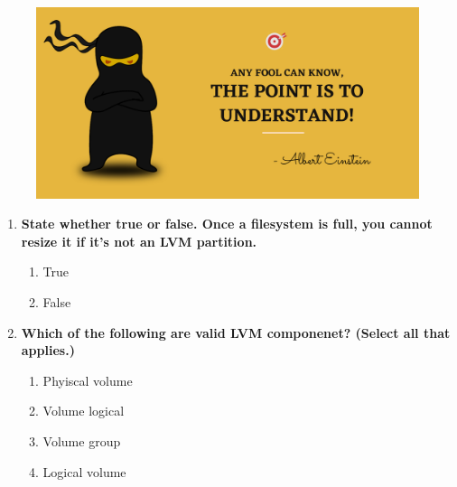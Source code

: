 \setlength{\columnsep}{3pt}
\begin{flushleft}
	
	\paragraph{}
	\bigskip
	
	\begin{figure}[h!]
		\centering
		\includegraphics[scale=.2]{content/practise.jpg}
	\end{figure}	
	\begin{enumerate}
		
		\item \textbf{State whether true or false. Once a filesystem is full, you cannot resize it if it's not an LVM partition.}
		\begin{enumerate}[label=(\alph*)]
			\item True %
			\item False
		\end{enumerate}
		\bigskip
		\bigskip
		
		
		\item \textbf{Which of the following are valid LVM componenet? (Select all that applies.)}
		\begin{enumerate}[label=(\alph*)]
			\item Phyiscal volume  %
			\item Volume logical  
			\item Volume group   %
			\item Logical volume %
		\end{enumerate}
		\bigskip
		\bigskip	
		

\end{enumerate}
\end{flushleft}
